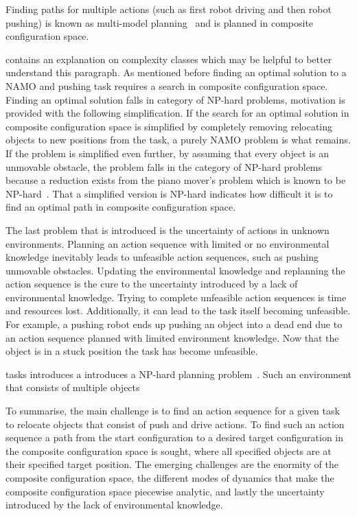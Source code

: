 Finding paths for multiple actions (such as first robot driving and then robot pushing) is known as multi-model planning~\cite{hauser_multimodal_2010} and is planned in composite configuration space. 


 contains an explanation on complexity classes which may be helpful to better understand this paragraph. As mentioned before finding an optimal solution to a \ac{NAMO} and pushing task requires a search in composite configuration space. Finding an optimal solution falls in category of \ac{NP-hard} problems, motivation is provided with the following simplification. If the search for an optimal solution in composite configuration space is simplified by completely removing relocating objects to new positions from the task, a purely \ac{NAMO} problem is what remains. If the problem is simplified even further, by assuming that every object is an unmovable obstacle, the problem falls in the category of \ac{NP-hard} problems because a reduction exists from the piano mover's problem which is known to be \ac{NP-hard}~\cite{reif_motion_1985}. That a simplified version is \ac{NP-hard} indicates how difficult it is to find an optimal path in composite configuration space.\bs

The last problem that is introduced is the uncertainty of actions in unknown environments. Planning an action sequence with limited or no environmental knowledge inevitably leads to unfeasible action sequences, such as pushing unmovable obstacles. Updating the environmental knowledge and replanning the action sequence is the cure to the uncertainty introduced by a lack of environmental knowledge. Trying to complete unfeasible action sequences is time and resources lost. Additionally, it can lead to the task itself becoming unfeasible. For example, a pushing robot ends up pushing an object into a dead end due to an action sequence planned with limited environment knowledge. Now that the object is in a stuck position the task has become unfeasible.\bs
{}

tasks introduces a introduces a \ac{NP-hard} planning problem~\cite{wilfong_motion_1991}. Such an environment that consists of multiple objects

To summarise, the main challenge is to find an action sequence for a given task to relocate objects that consist of push and drive actions. To find such an action sequence a path from the start configuration to a desired target configuration in the composite configuration space is sought, where all specified objects are at their specified target position. The emerging challenges are the enormity of the composite configuration space, the different modes of dynamics that make the composite configuration space piecewise analytic, and lastly the uncertainty introduced by the lack of environmental knowledge.\bs

